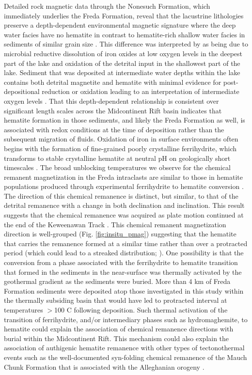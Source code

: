 \documentclass[draft]{agujournal2018}
\begin{document}
Detailed rock magnetic data through the Nonesuch Formation, which immediately underlies the Freda Formation, reveal that the lacustrine lithologies preserve a depth-dependent environmental magnetic signature where the deep water facies have no hematite in contrast to hematite-rich shallow water facies in sediments of similar grain size \citep{Slotznick2018b}. This difference was interpreted by \citet{Slotznick2018b} as being due to microbial reductive dissolution of iron oxides at low oxygen levels in the deepest part of the lake and oxidation of the detrital input in the shallowest part of the lake. Sediment that was deposited at intermediate water depths within the lake contains both detrital magnetite and hematite with minimal evidence for post-depositional reduction or oxidation leading to an interpretation of intermediate oxygen levels \citep{Slotznick2018b}. That this depth-dependent relationship is consistent over significant length scales across the Midcontinent Rift basin indicates that hematite formation in those sediments, and likely the Freda Formation as well, is associated with redox conditions at the time of deposition rather than the subsequent migration of fluids. Oxidation of iron in surface environments often begins with the formation of fine-grained poorly crystalline ferrihydrite, which transforms to stable crystalline hematite at neutral pH on geologically short timescales \citep{Cudennec2006a, Jiang2018a}. The broad unblocking temperatures we observe for the chemical remanent magnetization in the Freda intraclasts are similar to those in hematite populations produced through experimental ferrihydrite to hematite conversion \citep{Jiang2015a}. The direction of this chemical remanence is distinct, but similar, to that of the detrital remanence with a change in both declination and inclination. This result suggests that the chemical remanence was acquired as plate motion continued at the end of the Keweenawan Track \citep{Swanson-Hysell2018a}. This chemical remanent magnetization direction is well-grouped (Fig. \ref{fig:insitu_pmag}) suggesting that the hematite that carries the remanence formed at a similar time rather than over a protracted period (which could lead to a streaked distribution; \citealp{Beck2003b}). One possibility is that the conversion from a phase associated with the ferrihydrite to hematite transition that formed in the sediments in the near-surface was thermally activated by the geothermal gradient as the sediments were buried. More than 4 km of Freda Formation sediments were deposited atop those investigated in this study within the thermally subsiding basin that would have led to protracted interval at temperatures $>$100 \textdegree C following deposition. Such thermal activation of the transition of ferrihydrite, and/or intermediary phases such as hydromaghemite, to hematite could explain the association of chemical remanence directions with burial within the Midcontinent Rift. This mechanism could also explain the association of authigenic hematite remanence with other types of tectonothermal events such as the well-documented syn-folding chemical remanence of the Mauch Chunk Formation that is associated with the Alleghanian orogeny \citep{Kent1985b, Opdyke2004a}.
\end{document}
